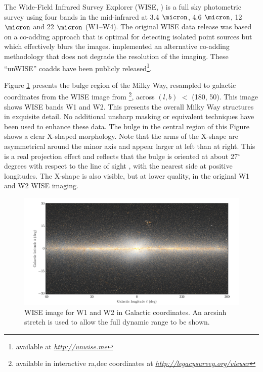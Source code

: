 \documentclass[12pt, preprint]{aastex}
\newcommand{\niceurl}[1]{\href{#1}{\textsl{#1}}}
\newcommand{\viewerurl}{\niceurl{http://legacysurvey.org/viewer}}
\begin{document}
The Wide-Field Infrared Survey Explorer (WISE, \citet{W2010}) is a full sky photometric survey using four bands in the mid-infrared at 3.4 $\micron$, 4.6 $\micron$, 12 $\micron$ and 22 $\micron$ (W1--W4). The original WISE data release was based on a co-adding approach that is optimal for detecting isolated point sources but which effectively blurs the images. \citet{Lang2014b} implemented an alternative co-adding methodology that does not degrade the resolution of the imaging.  These ``unWISE'' coadds have been publicly released\footnote{available at \niceurl{http://unwise.me}}.

Figure \ref{fig:xbulge} presents the bulge region of the Milky Way,  resampled to galactic coordinates from the WISE image from \citet{Lang2014a} \footnote{available in interactive ra,dec coordinates at \viewerurl}, across $(l,b)$ $<$ (180, 50).  This image shows WISE bands W1 and W2. This presents the overall Milky Way structures in exquisite detail.
No additional unsharp masking or equivalent techniques have been used to enhance these data. The bulge in the central region of this Figure shows a clear X-shaped morphology. Note that the arms of the X-shape are asymmetrical around the minor axis and appear larger at left than at right. This is a real projection effect and reflects that the bulge is oriented at about 27$^\circ$ degrees with respect to the line of sight \citep{Wegg2013}, with the nearest side at positive longitudes. The X-shape is also visible, but at lower quality, in the original W1 and W2 WISE imaging.  


\begin{figure}[h!]
\centering
        \includegraphics[width=\textwidth]{xbulge-00}
\caption{WISE image for W1 and W2 in Galactic coordinates.  An arcsinh
  stretch is used to allow the full dynamic range to be shown.}
\label{fig:xbulge}
\end{figure}
\end{document}
